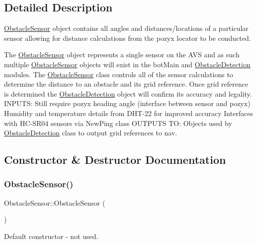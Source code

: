 \subsection{Detailed Description}
\mbox{\hyperlink{class_obstacle_sensor}{Obstacle\+Sensor}} object contains all angles and distances/locations of a particular sensor allowing for distance calculations from the pozyx locator to be conducted. 

The \mbox{\hyperlink{class_obstacle_sensor}{Obstacle\+Sensor}} object represents a single sensor on the A\+VS and as such multiple \mbox{\hyperlink{class_obstacle_sensor}{Obstacle\+Sensor}} objects will exist in the bot\+Main and \mbox{\hyperlink{class_obstacle_detection}{Obstacle\+Detection}} modules. The \mbox{\hyperlink{class_obstacle_sensor}{Obstacle\+Sensor}} class controls all of the sensor calculations to determine the distance to an obstacle and its grid reference. Once grid reference is determined the \mbox{\hyperlink{class_obstacle_detection}{Obstacle\+Detection}} object will confirm its accuracy and legality. I\+N\+P\+U\+TS\+: Still require pozyx heading angle (interface between sensor and pozyx) Humidity and temperature details from D\+H\+T-\/22 for improved accuracy Interfaces with H\+C-\/\+S\+R04 sensors via New\+Ping class O\+U\+T\+P\+U\+TS TO\+: Objects used by \mbox{\hyperlink{class_obstacle_detection}{Obstacle\+Detection}} class to output grid references to nav. 

\subsection{Constructor \& Destructor Documentation}
\mbox{\label{class_obstacle_sensor_ad1268ce55070472bf5ca463a919d1dd5}} 
\subsubsection{\texorpdfstring{Obstacle\+Sensor()}{ObstacleSensor()}\hspace{0.1cm}{\footnotesize\ttfamily [1/2]}}
{\footnotesize\ttfamily Obstacle\+Sensor\+::\+Obstacle\+Sensor (\begin{DoxyParamCaption}{ }\end{DoxyParamCaption})}



Default constructor -\/ not used. 

